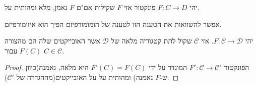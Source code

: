 \documentclass{tstextbook}
\begin{document}
\begin{proposition}
יהי \(F:C\to D\) פונקטור אזי \(F\) שקילות אם"ם \(F\) נאמן, מלא ומהותית על.

\end{proposition}
\begin{remark}
אפשר להשוואות את הטענה הזו לטענה של הומומורפיזם הפיך הוא איזומורפיזם.

\end{remark}
\begin{corollary}
יהי \(F:\mathcal{C}\to \mathcal{D}\). אזי \(\mathcal{C}\) שקול לתת קטגוריה מלאה של \(\mathcal{D}\) אשר האובייקטים שלה הם מהצורה \(F(C)\) עבור \(C \in \mathcal{C}\).

\end{corollary}
\begin{proof}
הפונקטור \(F':\mathcal{C}\to \mathcal{C'}\) המוגדר על ידי \(F'(C)=F(C)\) היא מלאה, נאמנה(כיוון ש-\(F\) נאמנה) ומהותית על על האובייקטים(מההגדרה של \(\mathcal{C'}\)). 

\end{proof}
\end{document}
